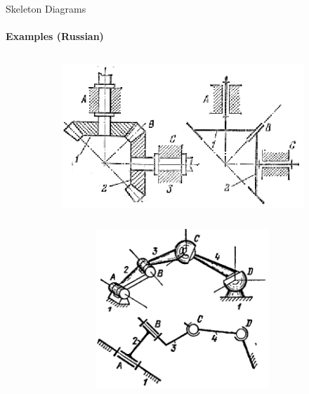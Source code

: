 \documentclass[aspectratio=169]{beamer}
\begin{document}
\begin{frame}[t]{Skeleton Diagrams}
\framesubtitle{Examples (Russian)}
\vspace{-0.5cm}
    \begin{figure}[H]
        \begin{subfigure}[c]{0.49\textwidth}
            \centering\includegraphics[height=6cm,width=1\textwidth,keepaspectratio]{rus1_mech.png}
            \label{fig:rus1_mech.png}
        \end{subfigure}
        \begin{subfigure}[c]{0.49\textwidth}
            \centering\includegraphics[height=6cm,width=1\textwidth,keepaspectratio]{rus2_mech.png}
            \label{fig:rus2_mech.png}
        \end{subfigure}
    \end{figure}
\end{frame}
\end{document}
